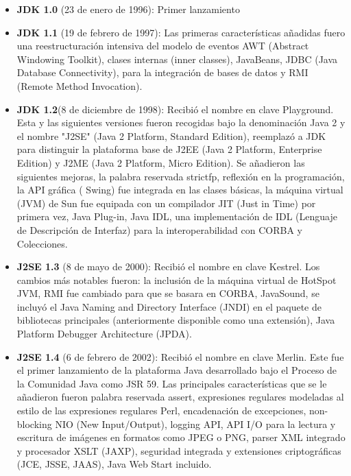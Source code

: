 \begin{itemize}

	\item \textbf{JDK 1.0} (23 de enero de 1996): Primer lanzamiento
	
	\item \textbf{JDK 1.1} (19 de febrero de 1997): Las primeras características añadidas fuero una reestructuración intensiva del modelo de eventos AWT (Abstract Windowing Toolkit), clases internas (inner classes), JavaBeans, JDBC (Java Database Connectivity), para la integración de bases de datos y RMI (Remote Method Invocation).
	
     \item \textbf{JDK 1.2}(8 de diciembre de 1998): Recibió el nombre en clave Playground. Esta y las siguientes versiones fueron recogidas bajo la denominación Java 2 y el nombre "J2SE" (Java 2 Platform, Standard Edition), reemplazó a JDK para distinguir la plataforma base de J2EE (Java 2 Platform, Enterprise Edition) y J2ME (Java 2 Platform, Micro Edition). 
    Se añadieron las siguientes mejoras, la palabra reservada strictfp, reflexión en la programación, la API gráfica ( Swing) fue integrada en las clases básicas, la máquina virtual (JVM) de Sun fue equipada con un compilador JIT (Just in Time) por primera vez, Java Plug-in, Java IDL, una implementación de IDL (Lenguaje de Descripción de Interfaz) para la interoperabilidad con CORBA y Colecciones.

    \item \textbf{J2SE 1.3} (8 de mayo de 2000): Recibió el nombre en clave Kestrel. Los cambios más notables fueron: la inclusión de la máquina virtual de HotSpot JVM, RMI fue cambiado para que se basara en CORBA, JavaSound, se incluyó el Java Naming and Directory Interface (JNDI) en el paquete de bibliotecas principales (anteriormente disponible como una extensión), Java Platform Debugger Architecture (JPDA).

    \item \textbf{J2SE 1.4} (6 de febrero de 2002): Recibió el nombre en clave Merlin. Este fue el primer lanzamiento de la plataforma Java desarrollado bajo el Proceso de la Comunidad Java como JSR 59. Las principales características que se le añadieron fueron palabra reservada assert, expresiones regulares modeladas al estilo de las expresiones regulares Perl, encadenación de excepciones, non-blocking NIO (New Input/Output), logging API, API I/O para la lectura y escritura de imágenes en formatos como JPEG o PNG, parser XML integrado y procesador XSLT (JAXP), seguridad integrada y extensiones criptográficas (JCE, JSSE, JAAS), Java Web Start incluido.
    

\end{itemize}
